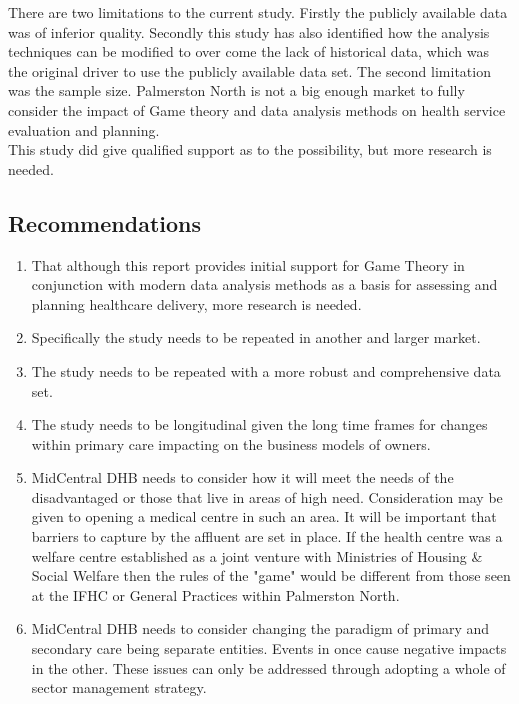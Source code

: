 \documentclass[11pt,a4paper]{article}
\begin{document}
There are two limitations to the current study. Firstly the publicly available data was of inferior quality. Secondly this study has also identified how the analysis techniques can be modified to over come the lack of historical data, which was the original driver to use the publicly available data set. The second limitation was the sample size. Palmerston North is not a big enough market to fully consider the impact of Game theory and data analysis methods on health service evaluation and planning.\\

This study did give qualified support as to the possibility, but more research is needed.\\

\subsection{Recommendations}
 
\begin{enumerate}
\item That although this report provides initial support for Game Theory in conjunction with modern data analysis methods as a basis for assessing and planning healthcare delivery, more research is needed.
\item Specifically the study needs to be repeated in another and larger market.
\item The study needs to be repeated with a more robust and comprehensive data set.
\item The study needs to be longitudinal given the long time frames for changes within primary care impacting on the business models of owners.
\item MidCentral DHB needs to consider how it will meet the needs of the disadvantaged or those that live in areas of high need. Consideration may be given to opening a medical centre in such an area. It will be important that barriers to capture by the affluent are set in place. If the health centre was a welfare centre established as a joint venture with Ministries of Housing \& Social Welfare then the rules of the "game" would be different from those seen at the IFHC or General Practices within Palmerston North.
\item MidCentral DHB needs to consider changing the paradigm of primary and secondary care being separate entities. Events in once cause negative impacts in the other. These issues can only be addressed through adopting a whole of sector management strategy. 
\end{enumerate}
\pagebreak
\end{document}
